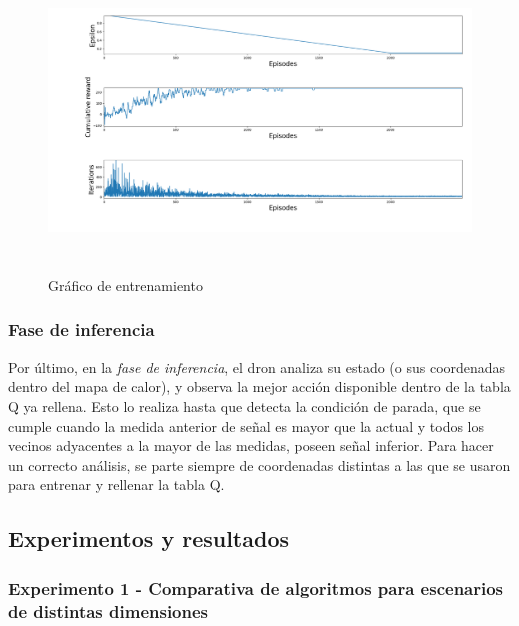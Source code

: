\begin{figure} [tp]
    \begin{center}
    \includegraphics[height=8cm]{imagenes/cap4/14_training_graph.png}
    \end{center}
    \caption[Gráfico de entrenamiento]{Gráfico de entrenamiento}
    \label{fig:training_graph}
\end{figure}

\subsubsection{Fase de inferencia}
\label{subsubsec:test}

Por último, en la \emph{fase de inferencia}, el dron analiza su estado (o sus coordenadas dentro del mapa de calor), y observa la mejor acción disponible dentro de la tabla Q ya rellena. Esto lo realiza hasta que detecta la condición de parada, que se cumple cuando la medida anterior de señal es mayor que la actual y todos los vecinos adyacentes a la mayor de las medidas, poseen señal inferior. Para hacer un correcto análisis, se parte siempre de coordenadas distintas a las que se usaron para entrenar y rellenar la tabla Q.

\subsection{Experimentos y resultados}
\label{subsec:experimentos_sf}

\subsubsection{Experimento 1 - Comparativa de algoritmos para escenarios de distintas dimensiones}
\label{subsubsec:experimentos_1}

